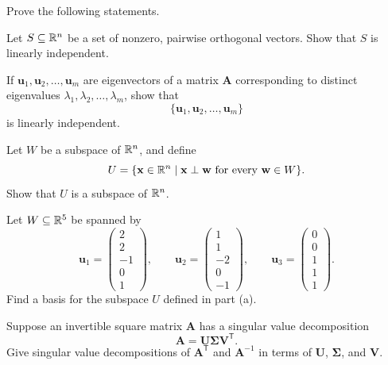 \begin{problem}
Prove the following statements.
\begin{problemsubparts}
\item Let $S\subseteq\mathbb{R}^n$ be a set of nonzero, pairwise orthogonal vectors. Show that $S$ is linearly independent.
\item If $\mathbf u_1,\mathbf u_2,\dots,\mathbf u_m$ are eigenvectors of a matrix $\mathbf A$ corresponding to distinct eigenvalues $\lambda_1,\lambda_2,\dots,\lambda_m$, show that
\[
\{\mathbf u_1,\mathbf u_2,\dots,\mathbf u_m\}
\]
is linearly independent.
\end{problemsubparts}
\end{problem}

\begin{problem}
\begin{problemsubparts}
\item Let $W$ be a subspace of $\mathbb{R}^n$, and define
\[
U=\{\mathbf x\in\mathbb{R}^n\mid \mathbf x\perp\mathbf w\text{ for every }\mathbf w\in W\}.
\]
Show that $U$ is a subspace of $\mathbb{R}^n$.
\item Let $W\subseteq\mathbb{R}^5$ be spanned by
\[
\mathbf u_1=
\begin{pmatrix}2\\2\\-1\\0\\1\end{pmatrix},
\qquad
\mathbf u_2=
\begin{pmatrix}1\\1\\-2\\0\\-1\end{pmatrix},
\qquad
\mathbf u_3=
\begin{pmatrix}0\\0\\1\\1\\1\end{pmatrix}.
\]
Find a basis for the subspace $U$ defined in part \textup{(a)}.
\end{problemsubparts}
\end{problem}

\begin{problem}
Suppose an invertible square matrix $\mathbf A$ has a singular value decomposition
\[
\mathbf A=\mathbf U\boldsymbol\Sigma\mathbf V^{\mathsf T}.
\]
Give singular value decompositions of $\mathbf A^{\mathsf T}$ and $\mathbf A^{-1}$ in terms of $\mathbf U$, $\boldsymbol\Sigma$, and $\mathbf V$.
\end{problem}

